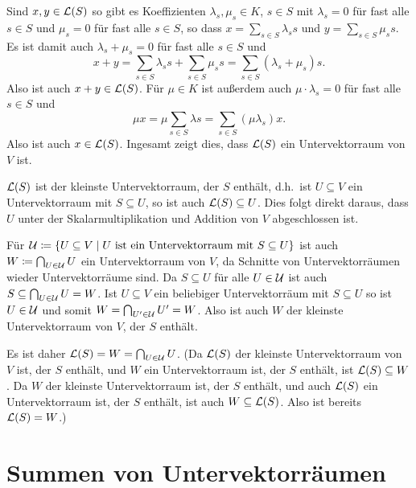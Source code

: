 Sind $x,y \in \mathcal{L}(S)$ so gibt es Koeffizienten $\lambda_s, \mu_s \in K$, $s \in S$ mit $\lambda_s = 0$ für fast alle $s \in S$ und $\mu_s = 0$ für fast alle $s \in S$, so dass $x = \sum_{s \in S} \lambda_s s$ und $y = \sum_{s \in S} \mu_s s$. Es ist damit auch $\lambda_s + \mu_s = 0$ für fast alle $s \in S$ und
\[
 x + y
 = \sum_{s \in S} \lambda_s s + \sum_{s \in S} \mu_s s
 = \sum_{s \in S} (\lambda_s + \mu_s) s.
\]
Also ist auch $x+y \in \mathcal{L}(S)$. Für $\mu \in K$ ist außerdem auch $\mu \cdot \lambda_s = 0$ für fast alle $s \in S$ und
\[
 \mu x
 = \mu \sum_{s \in S} \lambda s
 = \sum_{s \in S} (\mu \lambda_s) x.
\]
Also ist auch $x \in \mathcal{L}(S)$. Ingesamt zeigt dies, dass $\mathcal{L}(S)$ ein Untervektorraum von $V$ ist.

\begin{bem}
 $\mathcal{L}(S)$ ist der kleinste Untervektorraum, der $S$ enthält, d.h.\ ist $U \subseteq V$ ein Untervektorraum mit $S \subseteq U$, so ist auch $\mathcal{L}(S) \subseteq U$. Dies folgt direkt daraus, dass $U$ unter der Skalarmultiplikation und Addition von $V$ abgeschlossen ist.
 
 Für $\mathcal{U} \coloneqq \{U \subseteq V \mid \text{$U$ ist ein Untervektorraum mit $S \subseteq U$}\}$ ist auch $W \coloneqq \bigcap_{U \in \mathcal{U}} U$ ein Untervektorraum von $V$, da Schnitte von Untervektorräumen wieder Untervektorräume sind. Da $S \subseteq U$ für alle $U \in \mathcal{U}$ ist auch $S \subseteq \bigcap_{U \in \mathcal{U}} U = W$. Ist $U \subseteq V$ ein beliebiger Untervektorräum mit $S \subseteq U$ so ist $U \in \mathcal{U}$ und somit $W = \bigcap_{U' \in \mathcal{U}} U' = W$. Also ist auch $W$ der kleinste Untervektorraum von $V$, der $S$ enthält.
 
 Es ist daher $\mathcal{L}(S) = W = \bigcap_{U \in \mathcal{U}} U$. (Da $\mathcal{L}(S)$ der kleinste Untervektorraum von $V$ ist, der $S$ enthält, und $W$ ein Untervektorraum ist, der $S$ enthält, ist $\mathcal{L}(S) \subseteq W$. Da $W$ der kleinste Untervektorraum ist, der $S$ enthält, und auch $\mathcal{L}(S)$ ein Untervektorraum ist, der $S$ enthält, ist auch $W \subseteq \mathcal{L}(S)$. Also ist bereits $\mathcal{L}(S) = W$.)
\end{bem}










\section{Summen von Untervektorräumen}

